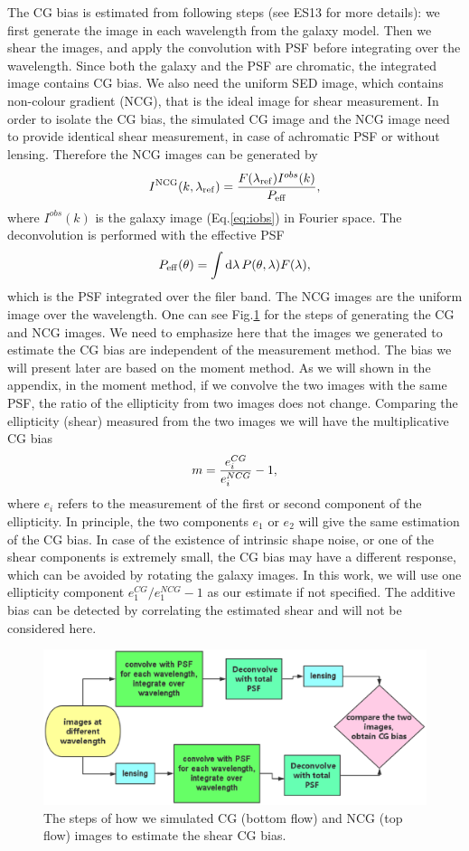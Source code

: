 \documentclass[useAMS,usenatbib]{mn2e}
\renewcommand{\d}{\mathrm{d}}
\newcommand{\be}{\begin{equation}}
\newcommand{\ee}{\end{equation}}
\begin{document}
The CG bias is estimated from following steps (see ES13 for more
details): we first generate the image in each wavelength from the
galaxy model. Then we shear the images, and apply the convolution with
PSF before integrating over the wavelength. Since both the galaxy and
the PSF are chromatic, the integrated image contains CG bias. We also
need the uniform SED image, which contains non-colour gradient (NCG),
that is the ideal image for shear measurement. In order to isolate the
CG bias, the simulated CG image and the NCG image need to provide
identical shear measurement, in case of achromatic PSF or without
lensing. Therefore the NCG images can be generated by
%
\be
I^{\rm NCG}(k, \lambda_{\rm ref}) = \dfrac{F(\lambda_{\rm ref}) I^{obs}(k)}
{P_{\rm eff}},
\ee
%
where $I^{obs}(k)$ is the galaxy image (Eq.\ref{eq:iobs}) in Fourier space.
The deconvolution is performed with the effective PSF
%
\be
P_{\rm eff}(\theta) = \int \d \lambda\, P(\theta,\lambda) F(\lambda),
\ee
%
which is the PSF integrated over the filer band.
The NCG images are the uniform image over the wavelength. One
can see Fig.\ref{fig:flowchart} for the steps of generating the CG and
NCG images. We need to emphasize here that the images we generated
to estimate the CG bias are independent of the measurement method.
The bias we will present later are based on the moment method. As we
will shown in the appendix, in the moment method, if we convolve the
two images with the same PSF, the ratio of the ellipticity from two
images does not change.
%
Comparing the ellipticity (shear) measured from the two images we will
have the multiplicative CG bias \citep{2006MNRAS.368.1323H}
%
\be
m= {e_i^{CG} \over e_i^{NCG} }-1,
\ee
%
where $e_i$ refers to the measurement of the first or second component
of the ellipticity. In principle, the two components $e_1$ or $e_2$
will give the same estimation of the CG bias. In case of the existence
of intrinsic shape noise, or one of the shear components is extremely
small, the CG bias may have a different response, which can be avoided by
rotating the galaxy images. In this work, we will use one
ellipticity component $e_1^{CG}/e_1^{NCG}-1$ as our estimate if not
specified. The additive bias can be detected by correlating the
estimated shear and will not be considered here.
%
\begin{figure}
\includegraphics[width=12.5cm]{colourg.eps}
\caption{The steps of how we simulated CG (bottom flow) and NCG (top
  flow) images to estimate the shear CG bias.}
\label{fig:flowchart}
\end{figure}
%
\end{document}
